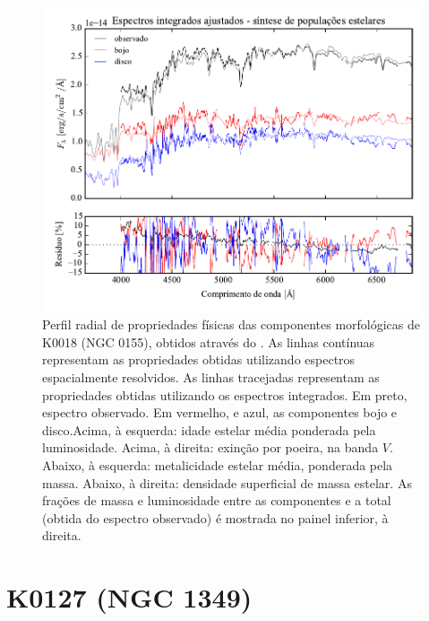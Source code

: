 \begin{figure}
	\includegraphics[page=2]{figuras/sample006a_synthesis}
	\caption[Propriedades físicas das componentes morfológicas de K0018 (NGC 0155)]
	{Perfil radial de propriedades físicas das componentes morfológicas de
	K0018 (NGC 0155), obtidos através do \starlight. As linhas contínuas
	representam as propriedades obtidas utilizando espectros espacialmente
	resolvidos. As linhas tracejadas representam as propriedades obtidas utilizando
	os espectros integrados. Em preto, espectro observado. Em vermelho, e azul, as
	componentes bojo e disco.Acima, à esquerda: idade estelar média ponderada pela
	luminosidade. Acima, à direita: exinção por poeira, na banda $V$. Abaixo, à
	esquerda: metalicidade estelar média, ponderada pela massa. Abaixo, à direita:
	densidade superficial de massa estelar. As frações de massa e luminosidade
	entre as componentes e a total (obtida do espectro observado) é mostrada no
	painel inferior, à direita.}
	\label{fig:decompSinteseRadprof:K0018}
\end{figure}


\section{K0127 (NGC 1349)}
\label{apendice:Decomp:K0127}


